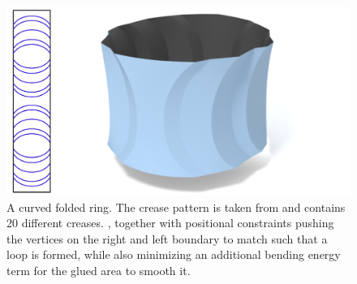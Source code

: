 \begin{figure} [t]
	\centering
	\includegraphics[width=0.65\linewidth]{figures/ring}
	\caption{A curved folded ring. The crease pattern is taken from \cite{mitani2019curved} and contains 20 different creases. , together with positional constraints pushing the vertices on the right and left boundary to match such that a loop is formed, while also minimizing an additional bending energy term for the glued area to smooth it.}
	\label{fig:ring}
\end{figure}